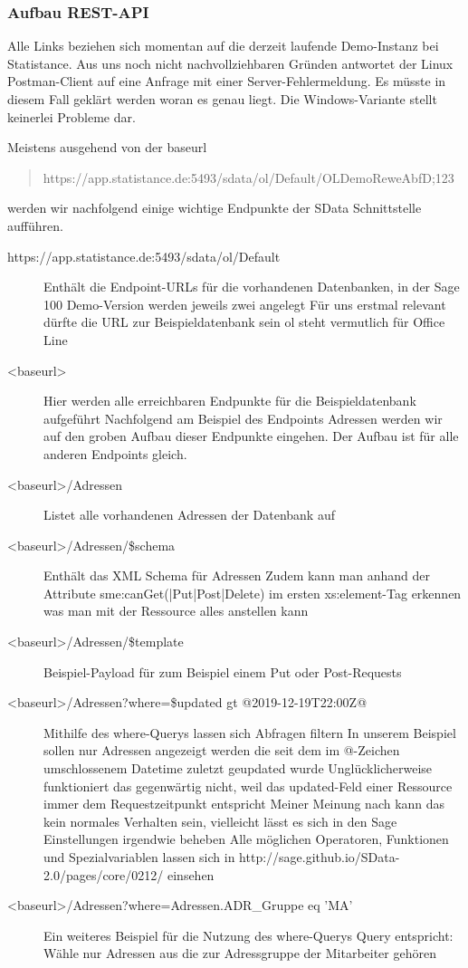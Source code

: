 \subsubsection*{Aufbau REST-API}
Alle Links beziehen sich momentan auf die derzeit laufende Demo-Instanz bei Statistance.
Aus uns noch nicht nachvollziehbaren Gründen antwortet der Linux Postman-Client auf eine Anfrage mit einer Server-Fehlermeldung. Es müsste in diesem Fall geklärt werden woran es genau liegt. Die Windows-Variante stellt keinerlei Probleme dar.

Meistens ausgehend von der baseurl 
\begin{quotation}
    https://app.statistance.de:5493/sdata/ol/Default/OLDemoReweAbfD;123
\end{quotation}
werden wir nachfolgend einige wichtige Endpunkte der SData Schnittstelle aufführen.

\begin{description}
    \item [https://app.statistance.de:5493/sdata/ol/Default]
    Enthält die Endpoint-URLs für die vorhandenen Datenbanken, in der Sage 100 Demo-Version werden jeweils zwei angelegt
Für uns erstmal relevant dürfte die URL zur Beispieldatenbank sein
ol steht vermutlich für Office Line
    \item [<baseurl>]
    Hier werden alle erreichbaren Endpunkte für die Beispieldatenbank aufgeführt
    Nachfolgend am Beispiel des Endpoints Adressen werden wir auf den groben Aufbau dieser Endpunkte eingehen. Der Aufbau ist für alle anderen Endpoints gleich.
    \item [<baseurl>/Adressen]
    Listet alle vorhandenen Adressen der Datenbank auf
    \item [<baseurl>/Adressen/\$schema]
    Enthält das XML Schema für Adressen
Zudem kann man anhand der Attribute sme:canGet(|Put|Post|Delete) im ersten xs:element-Tag erkennen was man mit der Ressource alles anstellen kann
    \item [<baseurl>/Adressen/\$template]
    Beispiel-Payload für zum Beispiel einem Put oder Post-Requests
    \item [<baseurl>/Adressen?where=\$updated gt @2019-12-19T22:00Z@]
    Mithilfe des where-Querys lassen sich Abfragen filtern
In unserem Beispiel sollen nur Adressen angezeigt werden die seit dem im @-Zeichen umschlossenem Datetime zuletzt geupdated wurde
Unglücklicherweise funktioniert das gegenwärtig nicht, weil das updated-Feld einer Ressource immer dem Requestzeitpunkt entspricht
Meiner Meinung nach kann das kein normales Verhalten sein, vielleicht lässt es sich in den Sage Einstellungen irgendwie beheben
Alle möglichen Operatoren, Funktionen und Spezialvariablen lassen sich in http://sage.github.io/SData-2.0/pages/core/0212/ einsehen
    \item [<baseurl>/Adressen?where=Adressen.ADR\_Gruppe eq 'MA']
    Ein weiteres Beispiel für die Nutzung des where-Querys
Query entspricht: Wähle nur Adressen aus die zur Adressgruppe der Mitarbeiter gehören
\end{description}